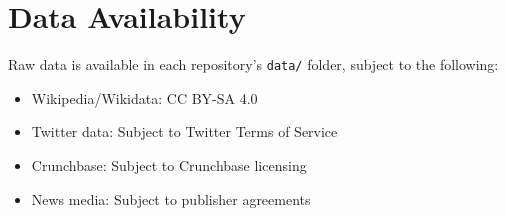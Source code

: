 \documentclass[../main.tex]{subfiles}
\begin{document}
\section{Data Availability}

Raw data is available in each repository's \texttt{data/} folder, subject to the following:

\begin{itemize}
\item Wikipedia/Wikidata: CC BY-SA 4.0
\item Twitter data: Subject to Twitter Terms of Service
\item Crunchbase: Subject to Crunchbase licensing
\item News media: Subject to publisher agreements
\end{itemize}
\end{document}
